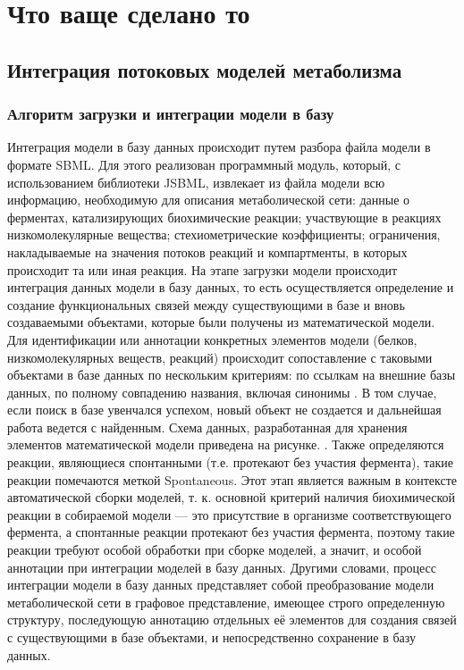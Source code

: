\chapter{Что ваще сделано то} \label{chapt3}

\section{Интеграция потоковых моделей метаболизма}

\subsection{Алгоритм загрузки и интеграции модели в базу}

Интеграция модели в базу данных происходит путем разбора файла модели в формате SBML. Для этого реализован программный модуль, который, с использованием библиотеки JSBML, извлекает из файла модели всю информацию, необходимую для описания метаболической сети: данные о ферментах, катализирующих биохимические реакции; участвующие в реакциях низкомолекулярные вещества; стехиометрические коэффициенты; ограничения, накладываемые на значения потоков реакций и компартменты, в которых происходит та или иная реакция. На этапе загрузки модели происходит интеграция данных модели в базу данных, то есть осуществляется определение и создание функциональных связей между существующими в базе и вновь создаваемыми объектами, которые были получены из математической модели. Для идентификации или аннотации конкретных элементов модели (белков, низкомолекулярных веществ, реакций) происходит сопоставление с таковыми объектами в базе данных по нескольким критериям: по ссылкам на внешние базы данных, по полному совпадению названия, включая синонимы . В том случае, если поиск в базе увенчался успехом, новый объект не создается и дальнейшая работа ведется с найденным. 
Схема данных, разработанная для хранения элементов математической модели приведена на рисунке. .
Также определяются реакции, являющиеся спонтанными (т.е. протекают без участия фермента), такие реакции помечаются меткой Spontaneous. Этот этап является важным в контексте автоматической сборки моделей, т. к. основной критерий наличия биохимической реакции в собираемой модели — это присутствие в организме соответствующего фермента, а спонтанные реакции протекают без участия фермента, поэтому такие реакции требуют особой обработки при сборке моделей, а значит, и особой аннотации при интеграции моделей в базу данных.
Другими словами, процесс интеграции модели в базу данных представляет собой преобразование модели метаболической сети в графовое представление, имеющее строго определенную структуру, последующую аннотацию отдельных её элементов для создания связей с существующими в базе объектами, и непосредственно сохранение в базу данных.

